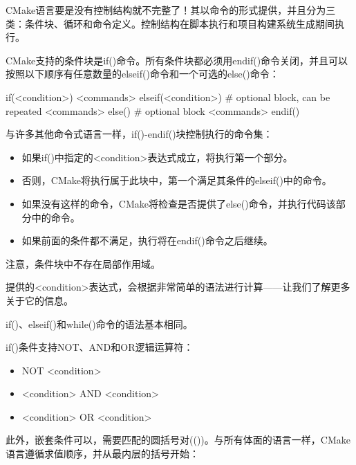 CMake语言要是没有控制结构就不完整了！其以命令的形式提供，并且分为三类：条件块、循环和命令定义。控制结构在脚本执行和项目构建系统生成期间执行。


CMake支持的条件块是if()命令。所有条件块都必须用endif()命令关闭，并且可以按照以下顺序有任意数量的elseif()命令和一个可选的else()命令：

\begin{shell}
if(<condition>)
    <commands>
elseif(<condition>) # optional block, can be repeated
    <commands>
else() # optional block
    <commands>
endif()
\end{shell}

与许多其他命令式语言一样，if()-endif()块控制执行的命令集：

\begin{itemize}
\item
如果if()中指定的<condition>表达式成立，将执行第一个部分。

\item
否则，CMake将执行属于此块中，第一个满足其条件的elseif()中的命令。

\item
如果没有这样的命令，CMake将检查是否提供了else()命令，并执行代码该部分中的命令。

\item
如果前面的条件都不满足，执行将在endif()命令之后继续。
\end{itemize}

注意，条件块中不存在局部作用域。

提供的<condition>表达式，会根据非常简单的语法进行计算——让我们了解更多关于它的信息。


if()、elseif()和while()命令的语法基本相同。


if()条件支持NOT、AND和OR逻辑运算符：

\begin{itemize}
\item
NOT <condition>

\item
<condition> AND <condition>

\item
<condition> OR <condition>
\end{itemize}

此外，嵌套条件可以，需要匹配的圆括号对(())。与所有体面的语言一样，CMake语言遵循求值顺序，并从最内层的括号开始：

